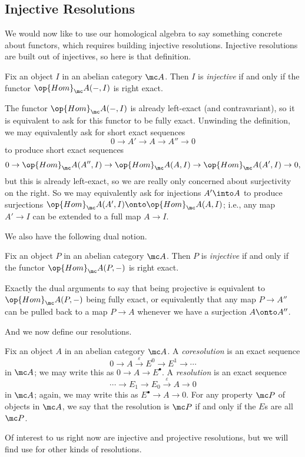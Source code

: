 \documentclass[../notes.tex]{subfiles}
\begin{document}
\subsection{Injective Resolutions}
We would now like to use our homological algebra to say something concrete about functors, which requires building injective resolutions. Injective resolutions are built out of injectives, so here is that definition.
\begin{definition}[injective]
	Fix an object $I$ in an abelian category $\mc A$. Then $I$ is \textit{injective} if and only if the functor $\op{Hom}_\mc A(-,I)$ is right exact.
\end{definition}
\begin{remark} \label{rem:better-inj}
	The functor $\op{Hom}_\mc A(-,I)$ is already left-exact (and contravariant), so it is equivalent to ask for this functor to be fully exact. Unwinding the definition, we may equivalently ask for short exact sequences
	\[0\to A'\to A\to A''\to0\]
	to produce short exact sequences
	\[0\to\op{Hom}_\mc A(A'',I)\to\op{Hom}_\mc A(A,I)\to\op{Hom}_\mc A(A',I)\to0,\]
	but this is already left-exact, so we are really only concerned about surjectivity on the right. So we may equivalently ask for injections $A'\into A$ to produce surjections $\op{Hom}_\mc A(A',I)\onto\op{Hom}_\mc A(A,I)$; i.e., any map $A'\to I$ can be extended to a full map $A\to I$.
\end{remark}
We also have the following dual notion.
\begin{definition}[projective]
	Fix an object $P$ in an abelian category $\mc A$. Then $P$ is \textit{injective} if and only if the functor $\op{Hom}_\mc A(P,-)$ is right exact.
\end{definition}
\begin{remark}
	Exactly the dual arguments to  say that being projective is equivalent to $\op{Hom}_\mc A(P,-)$ being fully exact, or equivalently that any map $P\to A''$ can be pulled back to a map $P\to A$ whenever we have a surjection $A\onto A''$.
\end{remark}
And we now define our resolutions.
\begin{definition}[resolution]
	Fix an object $A$ in an abelian category $\mc A$. A \textit{coresolution} is an exact sequence
	\[0\to A\stackrel\varepsilon\to E^0\to E^1\to\cdots\]
	in $\mc A$; we may write this as $0\to A\to E^\bullet$. A \textit{resolution} is an exact sequence
	\[\cdots\to E_1\to E_0\stackrel\varepsilon\to A\to0\]
	in $\mc A$; again, we may write this as $E^\bullet\to A\to0$. For any property $\mc P$ of objects in $\mc A$, we say that the resolution is $\mc P$ if and only if the $E$s are all $\mc P$.
\end{definition}
Of interest to us right now are injective and projective resolutions, but we will find use for other kinds of resolutions.
\end{document}
